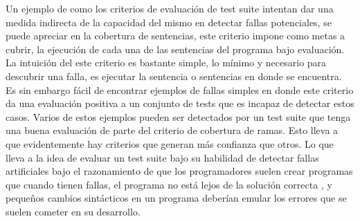 Un ejemplo de como los criterios de evaluaci\'on de test suite intentan dar una medida indirecta de la capacidad del mismo en detectar fallas potenciales, se puede apreciar en la cobertura de sentencias, este criterio impone como metas a cubrir, la ejecuci\'on de cada una de las sentencias del programa bajo evaluaci\'on. La intuici\'on del este criterio es bastante simple, lo m\'inimo y necesario para descubrir una falla, es ejecutar la sentencia o sentencias en donde se encuentra. Es sin embargo f\'acil de encontrar ejemplos de fallas simples en donde este criterio da una evaluaci\'on positiva a un conjunto de tests que es incapaz de detectar estos casos. Varios de estos ejemplos pueden ser detectados por un test suite que tenga una buena evaluaci\'on de parte del criterio de cobertura de ramas. Esto lleva a que evidentemente hay criterios que generan m\'as confianza que otros. Lo que lleva a la idea de evaluar un test suite bajo su habilidad de detectar fallas artificiales bajo el razonamiento de que los programadores suelen crear programas que cuando tienen fallas, el programa no est\'a lejos de la soluci\'on correcta \cite{bibliography.mutation.DeMillo}, y peque\~nos cambios sint\'acticos en un programa deber\'ian emular los errores que se suelen cometer en su desarrollo.

